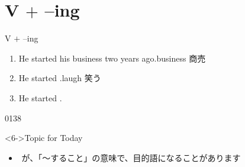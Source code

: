 \documentclass[aspectratio=169,xcolor={dvipsnames,table}]{beamer}
\begin{document}
\section{V $+$ --ing}
\begin{frame}[plain]{V $+$ --ing}
 \begin{enumerate}
  \item<1-> He started his business two years ago.\hfill{\scriptsize business  商売}
  \item<2-> He started .\hfill{\scriptsize laugh  笑う}
  \item<4-> He started .
 \end{enumerate}
%
\hfill{\tiny 0138}\,{\scriptsize {}}
\begin{block}<6->{Topic for Today}
\begin{itemize}[square]\small
 \item {}\,\,が、「〜すること」の意味で、目的語になることがあります
 \end{itemize}
     \end{block}
\end{frame}
\end{document}
